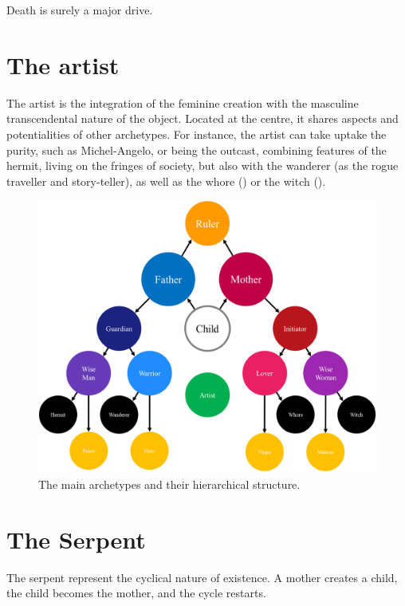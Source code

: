 \documentclass[]{book}
\begin{document}
Death is surely a major drive.

\hypertarget{the-artist}{%
\section{The artist}\label{the-artist}}

The artist is the integration of the feminine creation with the masculine transcendental nature of the object. Located at the centre, it shares aspects and potentialities of other archetypes. For instance, the artist can take uptake the purity, such as Michel-Angelo, or being the outcast, combining features of the hermit, living on the fringes of society, but also with the wanderer (as the rogue traveller and story-teller), as well as the whore () or the witch ().

\begin{figure}

{\centering \includegraphics[width=\textwidth]{img/archetypes} 

}

\caption{The main archetypes and their hierarchical structure.}\label{fig:unnamed-chunk-6}
\end{figure}

\hypertarget{the-serpent}{%
\section{The Serpent}\label{the-serpent}}

The serpent represent the cyclical nature of existence. A mother creates a child, the child becomes the mother, and the cycle restarts.
\end{document}
